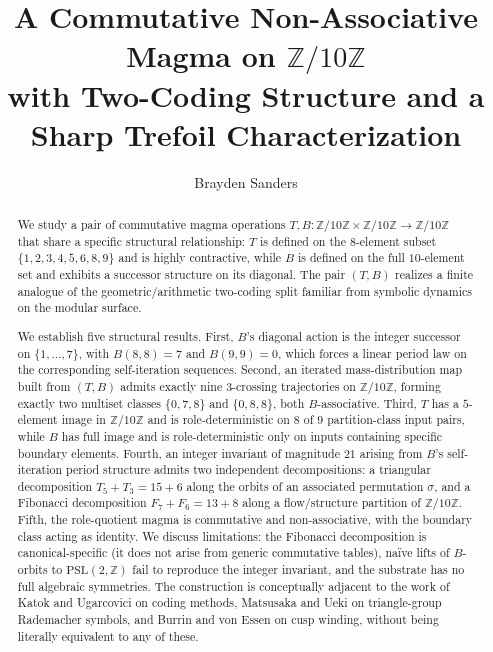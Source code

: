 \documentclass[submission,copyright,creativecommons]{eptcs}
\title{A Commutative Non-Associative Magma on $\mathbb{Z}/10\mathbb{Z}$\\
with Two-Coding Structure and a Sharp Trefoil Characterization}
\author{Brayden Sanders
\institute{7Site LLC, Hot Springs, AR, USA}
\email{brayden@7site.io}
}
\theoremstyle{plain}
\theoremstyle{definition}
\theoremstyle{remark}
\begin{document}
\maketitle

\begin{abstract}
We study a pair of commutative magma operations $T, B : \mathbb{Z}/10\mathbb{Z}
\times \mathbb{Z}/10\mathbb{Z} \to \mathbb{Z}/10\mathbb{Z}$ that share a
specific structural relationship: $T$ is defined on the $8$-element subset
$\{1,2,3,4,5,6,8,9\}$ and is highly contractive, while $B$ is defined on the
full $10$-element set and exhibits a successor structure on its diagonal.
The pair $(T, B)$ realizes a finite analogue of the geometric/arithmetic
two-coding split familiar from symbolic dynamics on the modular surface.

We establish five structural results. First, $B$'s diagonal action is the
integer successor on $\{1, \dots, 7\}$, with $B(8,8) = 7$ and $B(9,9) = 0$,
which forces a linear period law on the corresponding self-iteration
sequences. Second, an iterated mass-distribution map built from $(T, B)$
admits exactly nine $3$-crossing trajectories on $\mathbb{Z}/10\mathbb{Z}$,
forming exactly two multiset classes $\{0, 7, 8\}$ and $\{0, 8, 8\}$, both
$B$-associative. Third, $T$ has a $5$-element image in $\mathbb{Z}/10\mathbb{Z}$
and is role-deterministic on $8$ of $9$ partition-class input pairs, while
$B$ has full image and is role-deterministic only on inputs containing
specific boundary elements. Fourth, an integer invariant of magnitude $21$
arising from $B$'s self-iteration period structure admits two independent
decompositions: a triangular decomposition $T_5 + T_3 = 15 + 6$ along the
orbits of an associated permutation $\sigma$, and a Fibonacci decomposition
$F_7 + F_6 = 13 + 8$ along a flow/structure partition of
$\mathbb{Z}/10\mathbb{Z}$. Fifth, the role-quotient magma is commutative
and non-associative, with the boundary class acting as identity. We discuss
limitations: the Fibonacci decomposition is canonical-specific (it does not
arise from generic commutative tables), na\"ive lifts of $B$-orbits to
$\mathrm{PSL}(2, \mathbb{Z})$ fail to reproduce the integer invariant, and
the substrate has no full algebraic symmetries. The construction is
conceptually adjacent to the work of Katok and Ugarcovici on coding
methods, Matsusaka and Ueki on triangle-group Rademacher symbols, and
Burrin and von Essen on cusp winding, without being literally equivalent
to any of these.
\end{abstract}
\end{document}

